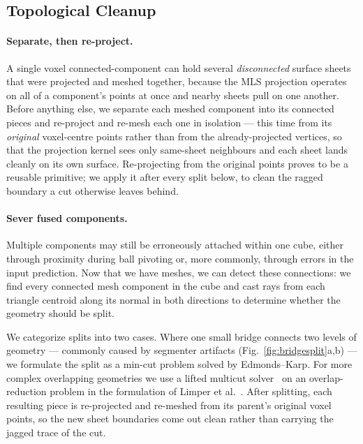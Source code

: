 \subsection{Topological Cleanup}
\label{sec:cleanup}


\paragraph{Separate, then re-project.} A single voxel connected-component can hold several \emph{disconnected} surface sheets that were projected and meshed together, because the MLS projection operates on all of a component's points at once and nearby sheets pull on one another. Before anything else, we separate each meshed component into its connected pieces and re-project and re-mesh each one in isolation --- this time from its \emph{original} voxel-centre points rather than from the already-projected vertices, so that the projection kernel sees only same-sheet neighbours and each sheet lands cleanly on its own surface. Re-projecting from the original points proves to be a reusable primitive; we apply it after every split below, to clean the ragged boundary a cut otherwise leaves behind.

\paragraph{Sever fused components.} Multiple components may still be erroneously attached within one cube, either through proximity during ball pivoting or, more commonly, through errors in the input prediction. Now that we have meshes, we can detect these connections: we find every connected mesh component in the cube and cast rays from each triangle centroid along its normal in both directions to determine whether the geometry should be split.

We categorize splits into two cases. Where one small bridge connects two levels of geometry --- commonly caused by segmenter artifacts (Fig.~\ref{fig:bridgesplit}a,b) --- we formulate the split as a min-cut problem solved by Edmonds--Karp. For more complex overlapping geometries we use a lifted multicut solver~\cite{keuper2015efficient} on an overlap-reduction problem in the formulation of Limper et al.~\cite{limper2018box}. After splitting, each resulting piece is re-projected and re-meshed from its parent's original voxel points, so the new sheet boundaries come out clean rather than carrying the jagged trace of the cut.

